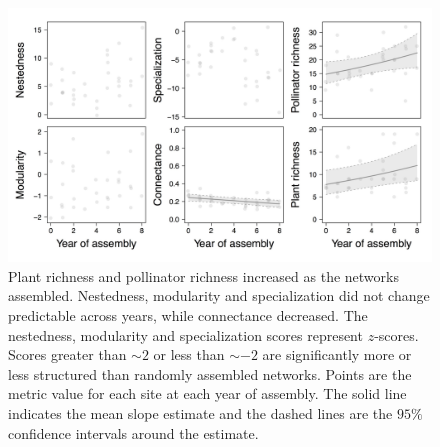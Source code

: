 \documentclass[12pt]{article}
\begin{document}
\begin{figure}
  \centering
  \includegraphics[width=1\textwidth]{figures/baci.jpeg}
  \caption{Plant richness and pollinator richness increased as the
    networks assembled. Nestedness, modularity and specialization did
    not change predictable across years, while connectance
    decreased. The nestedness, modularity and specialization scores
    represent $z$-scores. Scores greater than $\sim 2$ or less than
    $\sim -2$ are significantly more or less structured than randomly
    assembled networks. Points are the metric value for each site at
    each year of assembly. The solid line indicates the mean slope
    estimate and the dashed lines are the $95\%$ confidence intervals
    around the estimate.}
  \label{fig:baci}
\end{figure}
\clearpage
\end{document}
